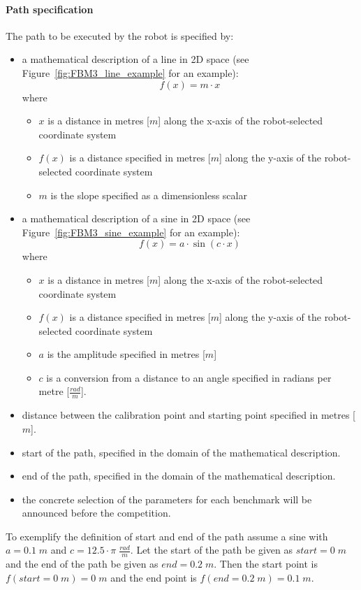 \paragraph{Path specification}
The path to be executed by the robot is specified by:
\begin{itemize}
\item a mathematical description of a line in 2D space (see Figure~\ref{fig:FBM3_line_example} for an example):
    \begin{displaymath}
    f(x) = m \cdot x
    \end{displaymath}
    where
    \begin{itemize}
    \item $x$ is a distance in metres [$m$] along the x-axis of the robot-selected coordinate system
    \item $f(x)$ is a distance specified in metres [$m$] along the y-axis of the robot-selected coordinate system
    \item $m$ is the slope specified as a dimensionless scalar
    \end{itemize}
\item a mathematical description of a sine in 2D space (see Figure~\ref{fig:FBM3_sine_example} for an example):
    \begin{displaymath}
    f(x) = a \cdot \sin(c \cdot x)
    \end{displaymath}
    where
    \begin{itemize}
    \item $x$ is a distance in metres [$m$] along the x-axis of the robot-selected coordinate system
    \item $f(x)$ is a distance specified in metres [$m$] along the y-axis of the robot-selected coordinate system
    \item $a$ is the amplitude specified in metres [$m$]
    \item $c$ is a conversion from a distance to an angle specified in radians per metre [$\frac{rad}{m}$].
    \end{itemize}
\item distance between the calibration point and starting point specified in metres [$m$].
\item start of the path, specified in the domain of the mathematical description.
\item end of the path, specified in the domain of the mathematical description.
\item the concrete selection of the parameters for each benchmark will be announced before the competition.
\end{itemize}
\noindent
To exemplify the definition of start and end of the path assume a sine with $a = 0.1\;m$ and $c = 12.5\cdot\pi\;\frac{rad}{m}$. Let the start of the path be given as $start = 0\;m$ and the end of the path be given as $end = 0.2\;m$. Then the start point is $f(start = 0\;m) = 0\;m$ and the end point is $f(end = 0.2\;m) = 0.1 \;m$.


